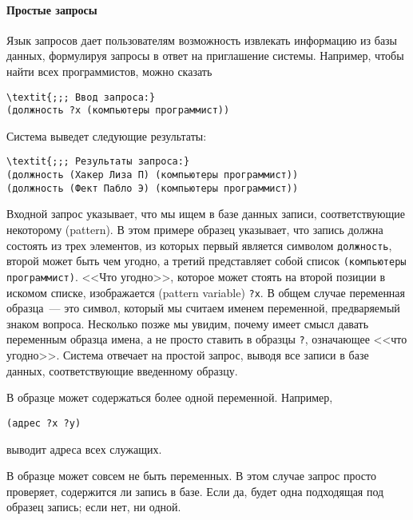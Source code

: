 \paragraph{Простые запросы}

Язык запросов дает пользователям 
возможность извлекать
информацию из базы данных, формулируя запросы в ответ на приглашение
системы.  Например, чтобы найти всех программистов, можно сказать

\begin{Verbatim}[fontsize=\small]
\textit{;;; Ввод запроса:}
(должность ?x (компьютеры программист))
\end{Verbatim}
Система выведет следующие результаты:

\begin{Verbatim}[fontsize=\small]
\textit{;;; Результаты запроса:}
(должность (Хакер Лиза П) (компьютеры программист))
(должность (Фект Пабло Э) (компьютеры программист))
\end{Verbatim}

Входной запрос указывает, что мы ищем в базе данных
записи, соответствующие
некоторому 
 (pattern).  В этом примере образец
указывает, что запись должна состоять из трех элементов, из которых
первый является символом {\tt должность}, второй может быть
чем угодно, а третий представляет собой список 
{\tt (компьютеры программист)}. <<Что угодно>>, которое может
стоять на второй позиции в искомом списке, изображается 
 (pattern variable)
{\tt ?x}.  В общем случае переменная образца~--- это символ,
который мы считаем именем переменной, предваряемый знаком
вопроса.  Несколько позже мы увидим, почему имеет смысл давать переменным
образца имена, а не просто ставить в образцы {\tt ?},
означающее <<что угодно>>.  Система отвечает на простой запрос, выводя
все записи в базе данных, соответствующие введенному образцу.

В образце может содержаться более одной переменной.
Например,

\begin{Verbatim}[fontsize=\small]
(адрес ?x ?y)
\end{Verbatim}
выводит адреса всех служащих.

В образце может совсем не быть переменных.  В этом случае
запрос просто проверяет, содержится ли запись в базе.  Если да, будет
одна подходящая под образец запись; если нет, ни одной.

